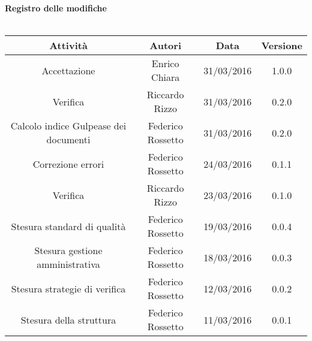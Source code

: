 \vspace{1cm}
   {\fontsize{15pt}{16pt}\selectfont \textbf{Registro delle modifiche}}\\ \\

\bgroup
\def\arraystretch{1.6}
\begin{tabular}{| c | c | c | c |}
\hline
\textbf{Attività} & \textbf{Autori} & \textbf{Data} & \textbf{Versione}\\ \hline \hline


Accettazione & Enrico Chiara & 31/03/2016 & 1.0.0 \\ \hline 

Verifica & Riccardo Rizzo & 31/03/2016 & 0.2.0 \\ \hline  

Calcolo indice Gulpease dei documenti & Federico Rossetto & 31/03/2016 & 0.2.0 \\ \hline  

Correzione errori & Federico Rossetto & 24/03/2016 & 0.1.1 \\ \hline 

Verifica & Riccardo Rizzo & 23/03/2016 & 0.1.0 \\ \hline  

Stesura standard di qualità & Federico Rossetto & 19/03/2016 & 0.0.4 \\ \hline 

Stesura gestione amministrativa & Federico Rossetto & 18/03/2016 & 0.0.3 \\ \hline 

Stesura strategie di verifica & Federico Rossetto & 12/03/2016 & 0.0.2 \\ \hline 

Stesura della struttura & Federico Rossetto & 11/03/2016 & 0.0.1 \\ \hline 


\end{tabular}
\egroup
\newpage